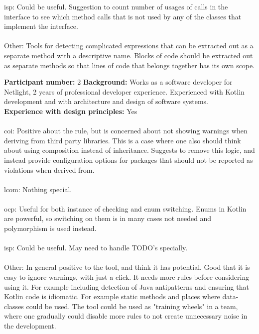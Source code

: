 \noindent \gls{isp}: Could be useful. Suggestion to count number of usages of calls in the interface to see which method calls that is not used by any of the classes that implement the interface. \\\\

\noindent Other: Tools for detecting complicated expressions that can be extracted out as a separate method with a descriptive name. Blocks of code should be extracted out as separate methods so that lines of code that belongs together has its own scope. 
\clearpage


\noindent\textbf{Participant number:} 2 \newline
\textbf{Background:} Works as a software developer for Netlight, 2 years of professional developer experience. Experienced with Kotlin development and with architecture and design of software systems.\\
\textbf{Experience with design principles:} Yes \\\\

\noindent \gls{coi}: Positive about the rule, but is concerned about not showing warnings when deriving from third party libraries. This is a case where one also should think about using composition instead of inheritance. Suggests to remove this logic, and instead provide configuration options for packages that should not be reported as violations when derived from.  \\\\

\noindent \gls{lcom}: Nothing special. \\\\

\noindent \gls{ocp}: Useful for both instance of checking and enum switching. Enums in Kotlin are powerful, so switching on them is in many cases not needed and polymorphism is used instead.\\\\

\noindent \gls{isp}: Could be useful. May need to handle TODO's specially. \\\\

\noindent Other: In general positive to the tool, and think it has potential. Good that it is easy to ignore warnings, with just a click. It needs more rules before considering using it. For example including detection of Java antipatterns and ensuring that Kotlin code is idiomatic. For example static methods and places where data-classes could be used. The tool could be used as "training wheels" in a team, where one gradually could disable more rules to not create unnecessary noise in the development.
\clearpage

